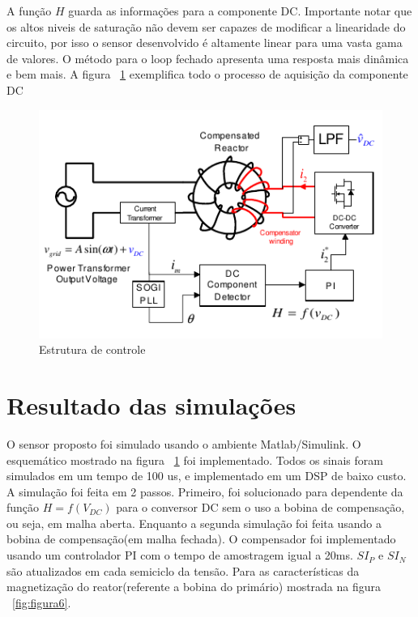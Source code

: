\documentclass[paper=a4, fontsize=11pt]{article}
\begin{document}
A função $H$ guarda as informações para a componente DC. Importante notar que os 
altos niveis de saturação não devem ser capazes de modificar a linearidade do 
circuito, por isso o sensor desenvolvido é altamente linear para uma vasta gama 
de valores. O método para o loop fechado apresenta uma resposta mais dinâmica e 
bem mais. A figura ~\ref{fig:figura4} exemplifica todo o processo de aquisição 
da componente DC

\begin{figure}[!ht]
	\centering
	\includegraphics[scale=.8]{fig4.png}
    \caption{Estrutura de controle}
    \label{fig:figura4}
\end{figure}

\section{Resultado das simulações}

O sensor proposto foi simulado usando o ambiente Matlab/Simulink. O esquemático mostrado
na figura ~\ref{fig:figura4} foi implementado. Todos os sinais foram simulados em
um tempo de 100 us, e implementado em um DSP de baixo custo. A simulação foi feita 
em 2 passos. Primeiro, foi solucionado para dependente da função $H=f(V_{DC})$ para 
o conversor DC sem o uso a bobina de compensação, ou seja, em malha aberta. Enquanto
a segunda simulação foi feita usando a bobina de compensação(em malha fechada).
O compensador foi implementado usando um controlador PI com o tempo de amostragem igual
a 20ms. $SI_P$ e $SI_N$ são atualizados em cada semiciclo da tensão. Para as características
da magnetização do reator(referente a bobina do primário) mostrada na figura ~\ref{fig:figura6}.
\end{document}
